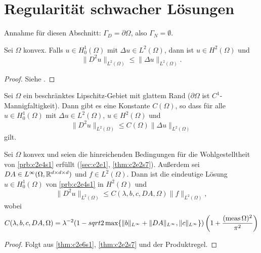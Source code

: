 \documentclass[../skript.tex]{subfiles}
\begin{document}
\section{Regularität schwacher Lösungen}\label{sec:c2e6}
Annahme für diesen Abschnitt: $\Gamma_D = \partial\Omega$, also $\Gamma_N = \emptyset$.
\begin{theorem}\label{thm:c2e6s1}
	Sei $\Omega$ konvex. Falls $u\in H^1_0(\Omega)$ mit $\Delta u\in L^2(\Omega)$, dann ist $u\in H^2(\Omega)$ und 
	\[
		\|D^2u\|_{L^2(\Omega)} \leq \|\Delta u\|_{L^2(\Omega)}.
	\]
\end{theorem}
\begin{proof}
	Siehe \cite{Grisvard}.
\end{proof}
\begin{theorem}\label{thm:c2e6s2}
	Sei $\Omega$ ein beschränktes Lipschitz-Gebiet mit glattem Rand ($\partial\Omega$ ist $ C^1$-Mannigfaltigkeit). Dann gibt es eine Konstante $C(\Omega)$, so dass für alle $u\in H^1_0(\Omega)$ mit $\Delta u\in L^2(\Omega)$, $u\in H^2(\Omega)$ und 
	\[
		\|D^2u\|_{L^2(\Omega)}\leq C(\Omega)\|\Delta u\|_{L^2(\Omega)}
	\]
	gilt.
\end{theorem}
\begin{theorem}\label{thm:c2e6s3}
	Sei $\Omega$ konvex und seien die hinreichenden Bedingungen für die Wohlgestelltheit von \cref{prb:c2e4s1} erfüllt (\cref{sec:c2e1}, \cref{thm:c2e2s7}). Außerdem sei $DA\in L^\infty(\Omega,\mathbb{R}^{d\times d\times d})$ und $f\in L^2(\Omega)$. Dann ist die eindeutige Lösung $u\in H^1_0(\Omega)$ von \cref{prb:c2e4s1} in $H^2(\Omega)$ und
	\[
		\|D^2u\|_{L^2(\Omega)} \leq C(\lambda,b,c,DA,\Omega)\|f\|_{L^2(\Omega)},
	\]
	wobei 
	\[
		C(\lambda,b,c,DA,\Omega) =  \lambda^{-2}(1-sqrt{2}\max\{\|b\|_{L^\infty}+\|DA\|_{L^\infty},\|c\|_{L^\infty}\})\left(1+\frac{(\operatorname{meas}{\Omega})^2}{\pi^2}\right)
	\]
\end{theorem}
\begin{proof}
	Folgt aus \cref{thm:c2e6s1}, \cref{thm:c2e2s7} und der Produktregel.
\end{proof}
\end{document}
